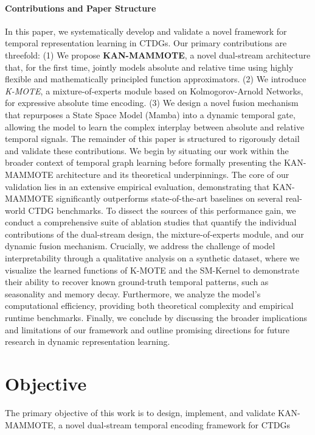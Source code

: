 \documentclass{article}
\begin{document}
\paragraph{Contributions and Paper Structure}
In this paper, we systematically develop and validate a novel framework for temporal representation learning in CTDGs. Our primary contributions are threefold: (1) We propose \textbf{KAN-MAMMOTE}, a novel dual-stream architecture that, for the first time, jointly models absolute and relative time using highly flexible and mathematically principled function approximators. (2) We introduce \textit{K-MOTE}, a mixture-of-experts module based on Kolmogorov-Arnold Networks, for expressive absolute time encoding. (3) We design a novel fusion mechanism that repurposes a State Space Model (Mamba) into a dynamic temporal gate, allowing the model to learn the complex interplay between absolute and relative temporal signals. The remainder of this paper is structured to rigorously detail and validate these contributions. We begin by situating our work within the broader context of temporal graph learning before formally presenting the KAN-MAMMOTE architecture and its theoretical underpinnings. The core of our validation lies in an extensive empirical evaluation, demonstrating that KAN-MAMMOTE significantly outperforms state-of-the-art baselines on several real-world CTDG benchmarks. To dissect the sources of this performance gain, we conduct a comprehensive suite of ablation studies that quantify the individual contributions of the dual-stream design, the mixture-of-experts module, and our dynamic fusion mechanism. Crucially, we address the challenge of model interpretability through a qualitative analysis on a synthetic dataset, where we visualize the learned functions of K-MOTE and the SM-Kernel to demonstrate their ability to recover known ground-truth temporal patterns, such as seasonality and memory decay. Furthermore, we analyze the model's computational efficiency, providing both theoretical complexity and empirical runtime benchmarks. Finally, we conclude by discussing the broader implications and limitations of our framework and outline promising directions for future research in dynamic representation learning.
\section*{Objective}
The primary objective of this work is to design, implement, and validate KAN-MAMMOTE, a novel dual-stream temporal encoding framework for CTDGs
\end{document}
